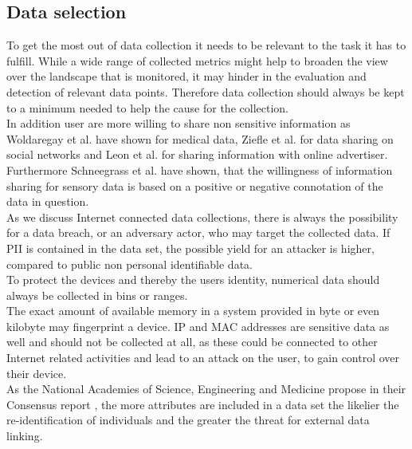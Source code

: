     \subsection{Data selection}
        \label{subsec:software_design:selection}
        To get the most out of data collection it needs to be relevant to the task it has to fulfill.
        While a wide range of collected metrics might help to broaden the view over the landscape that is monitored, it may hinder in the evaluation and detection of relevant data points. Therefore data collection should always be kept to a minimum needed to help the cause for the collection.\\
        In addition user are more willing to share non sensitive information as Woldaregay et al. \cite{woldaregay_user_2020} have shown for medical data, Ziefle et al.\cite{ziefle_users_2016} for data sharing on social networks and Leon et al. \cite{leon_what_2013} for sharing information with online advertiser. Furthermore Schneegrass et al. \cite{10.1145/3290605.3300753} have shown, that the willingness of information sharing for sensory data is based on a positive or negative connotation of the data in question.\\
        
        As we discuss Internet connected data collections, there is always the possibility for a data breach, or an adversary actor, who may target the collected data. If PII is contained in the data set, the possible yield for an attacker is higher, compared to public non personal identifiable data.\\
        To protect the devices and thereby the users identity, numerical data should always be collected in bins or ranges.\\
        The exact amount of available memory in a system provided in byte or even kilobyte may fingerprint a device. IP and MAC addresses are sensitive data as well and should not be collected at all, as these could be connected to other Internet related activities and lead to an attack on the user, to gain control over their device. \\
        As the National Academies of Science, Engineering and Medicine propose in their Consensus report \cite{groves_federal_2017}, the more attributes are included in a data set the likelier the re-identification of individuals and the greater the threat for external data linking.\\
        
